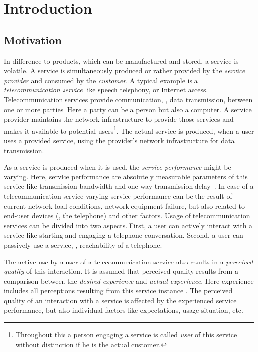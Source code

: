 \chapter{Introduction}\label{chap:01}

\section{Motivation}
In difference to products, which can be manufactured and stored, a service is volatile.
A service is simultaneously produced or rather provided by the \emph{service provider} and consumed by the \emph{customer}.
A typical example is a \emph{telecommunication service} like speech telephony, or Internet access.
Telecommunication services provide communication, \ie, data transmission, between one or more parties.
Here a party can be a person but also a computer.
A service provider maintains the network infrastructure to provide those services and makes it available to potential users\footnote{Throughout this a person engaging a service is called \emph{user} of this service without distinction if he is the actual customer.}.
The actual service is produced, when a user uses a provided service, using the provider's network infrastructure for data transmission.

As a service is produced when it is used, the \emph{service performance} might be varying.
Here, service performance are absolutely measurable parameters of this service like transmission bandwidth and one-way transmission delay~\citep[\cf,][p. 12]{moller_assessment_2000}.
In case of a telecommunication service varying service performance can be the result of current network load conditions, network equipment failure, but also related to end-user devices (\eg, the telephone) and other factors.
Usage of telecommunication services can be divided into two aspects.
First, a user can actively interact with a service like starting and engaging a telephone conversation.
Second, a user can passively use a service, \eg, reachability of a telephone.

The active use by a user of a telecommunication service also results in a \emph{perceived quality} of this interaction.
It is assumed that perceived quality results from a comparison between the \emph{desired experience} and \emph{actual experience}. %
Here experience includes all perceptions resulting from this service instance \citep[\cf,][p.13]{raake_quality_2014}.
The perceived quality of an interaction with a service is affected by the experienced service performance, but also individual factors like expectations, usage situation, etc.


